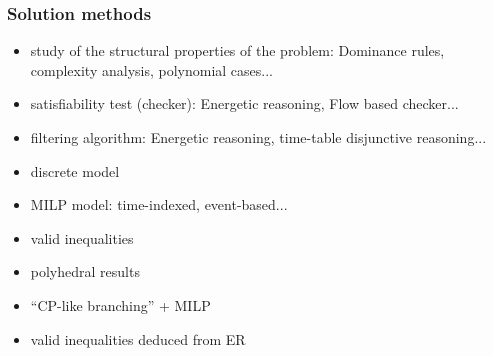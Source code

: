 \begin{frame}
  \frametitle{Solution methods}
  \vfill
  \begin{description}[Properties]
  \item[Properties] {\small
      \begin{itemize}
      \item study of the structural properties of the problem:
        {\footnotesize Dominance rules, complexity analysis, polynomial cases...}
      \end{itemize}}
    \vfill
    \pause
  \item[CP] {\small
      \begin{itemize}
      \item satisfiability test (checker): {\footnotesize Energetic
          reasoning, Flow based checker...}
      \item filtering algorithm: {\footnotesize Energetic reasoning, time-table
          disjunctive reasoning...}
      \item discrete model
      \end{itemize}}
    \vfill
    \pause
  \item[MILP] {\small
      \begin{itemize}
      \item MILP model: {\footnotesize time-indexed, event-based...}
      \item valid inequalities
      \item polyhedral results
      \end{itemize}}
    \vfill
    \pause
  \item[Hybrid] {\small
      \begin{itemize}
      \item ``CP-like branching'' + MILP 
      \item valid inequalities deduced from ER
      \end{itemize}}
  \end{description}
\end{frame}
